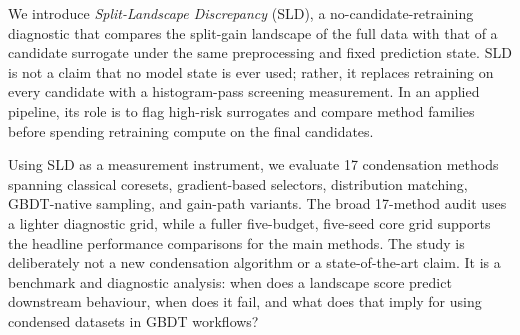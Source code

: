 We introduce \emph{Split-Landscape Discrepancy} (SLD), a
no-candidate-retraining diagnostic that compares the split-gain landscape of
the full data with that of a candidate surrogate under the same preprocessing
and fixed prediction state. SLD is not a claim that no model state is ever
used; rather, it replaces retraining on every candidate with a histogram-pass
screening measurement. In an applied pipeline, its role is to flag high-risk
surrogates and compare method families before spending retraining compute on
the final candidates.

Using SLD as a measurement instrument, we evaluate 17 condensation methods
spanning classical coresets, gradient-based selectors, distribution matching,
GBDT-native sampling, and gain-path variants. The broad 17-method audit uses a
lighter diagnostic grid, while a fuller five-budget, five-seed core grid
supports the headline performance comparisons for the main methods. The study
is deliberately not a new condensation algorithm or a state-of-the-art claim.
It is a benchmark and diagnostic analysis: when does a landscape score predict
downstream behaviour, when does it fail, and what does that imply for using
condensed datasets in GBDT workflows?


